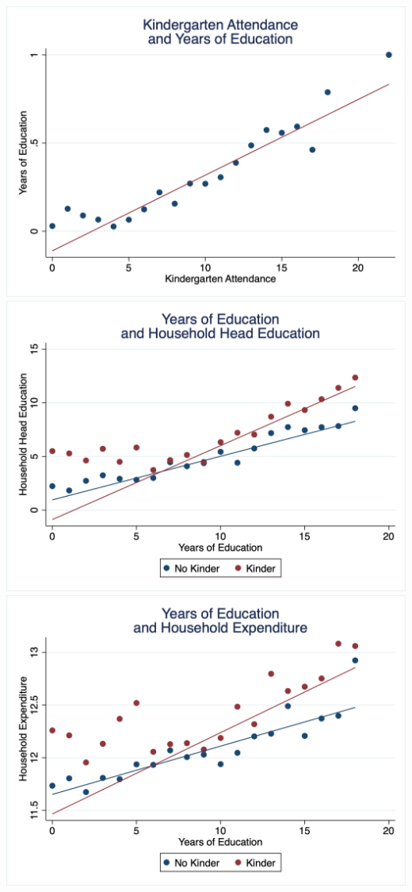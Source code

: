 \documentclass[6pt]{article}
\begin{document}
\includegraphics[width=\textwidth]{kinder_ever_educ14.png}
\includegraphics[width=\textwidth]{educ_hh_educ14.png}
\includegraphics[width=\textwidth]{ln_agg_expend_r_pc_educ14.png}
\end{document}
